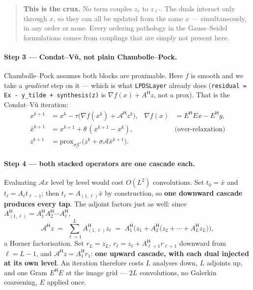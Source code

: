 \documentclass[11pt]{article}
\newcommand{\bA}{\mathcal{A}}
\newcommand{\bG}{\mathcal{G}}
\newcommand{\adj}{{\mathsf H}}
\newcommand{\Aell}{A_{(1,\ell)}}
\begin{document}
\begin{quote}\color{accent}
\textbf{This is the crux.} No term couples $z_\ell$ to $z_{\ell'}$. The duals interact only through $x$, so
they can all be updated from the same $x$ --- simultaneously, in any order or none. Every ordering pathology
in the Gauss--Seidel formulations comes from couplings that are simply not present here.
\end{quote}

\paragraph{Step 3 --- Condat--V\~u, not plain Chambolle--Pock.}
Chambolle--Pock assumes both blocks are proximable. Here $f$ is smooth and we take a \emph{gradient} step on
it --- which is what \texttt{LPDSLayer} already does (\texttt{residual = Ex - y\_tilde + synthesis(z)} is
$\nabla f(x) + A^\adj z$, not a prox). That is the Condat--V\~u iteration:
\begin{align}
  x^{k+1}      &= x^{k} - \tau\big(\nabla f(x^{k}) + \bA^\adj z^{k}\big),
                  &\nabla f(x) &= E^\adj E x - E^\adj y, \label{eq:cv-primal}\\
  \bar x^{k+1} &= x^{k+1} + \theta\,(x^{k+1} - x^{k}), & &\text{(over-relaxation)}\\
  z^{k+1}      &= \mathrm{prox}_{\sigma \bG^*}\big(z^{k} + \sigma \bA \bar x^{k+1}\big). &&
\end{align}

\paragraph{Step 4 --- both stacked operators are one cascade each.}
Evaluating $\bA x$ level by level would cost $O(L^2)$ convolutions. Set $t_0 = \bar x$ and
$t_\ell = A_\ell t_{\ell-1}$; then $t_\ell = \Aell \bar x$ by construction, so \textbf{one downward cascade
produces every tap}. The adjoint factors just as well: since
$\Aell^\adj = A_1^\adj A_2^\adj \cdots A_\ell^\adj$,
\begin{equation}\label{eq:horner}
  \bA^\adj z \;=\; \sum_{\ell=1}^{L} \Aell^\adj z_\ell
  \;=\; A_1^\adj\Big(z_1 + A_2^\adj\big(z_2 + \cdots + A_L^\adj z_L\big)\Big),
\end{equation}
a Horner factorisation. Set $r_L = z_L$, $r_\ell = z_\ell + A_{\ell+1}^\adj r_{\ell+1}$ downward from
$\ell = L-1$, and $\bA^\adj z = A_1^\adj r_1$: \textbf{one upward cascade, with each dual injected at its own
level}. An iteration therefore costs $L$ analyses down, $L$ adjoints up, and one Gram $E^\adj E$ at the image
grid --- $2L$ convolutions, no Galerkin coarsening, $E$ applied once.
\end{document}
